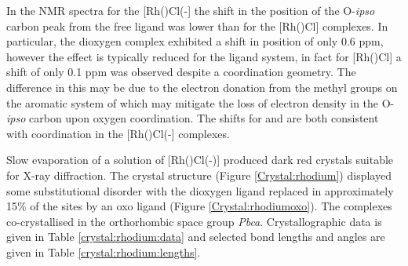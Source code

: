 
In the \carbon{} NMR spectra for the [Rh(\tBuxantphos)Cl(-] the shift in the position of the O-\emph{ipso} carbon peak from the free ligand was lower than for the [Rh(\tBuxantphos)Cl] complexes.  In particular, the \tButhixantphos{} dioxygen complex exhibited a shift in position of only 0.6 ppm, however the effect is typically reduced for the \tButhixantphos{} ligand system, in fact for [Rh(\tButhixantphos)Cl] a shift of only 0.1 ppm was observed despite a\POP{} coordination geometry.  The difference in this may be due to the electron donation from the methyl groups on the aromatic system of \tButhixantphos{} which may mitigate the loss of electron density in the O-\emph{ipso} carbon upon oxygen coordination.  The shifts for \tBusixantphos{} and \tBuxantphos{} are both consistent with \POP{} coordination in the [Rh(\tBuxantphos)Cl(-] complexes.  

Slow evaporation of a  solution of [Rh(\tBuxantphosk)Cl(-)] produced dark red crystals suitable for X-ray diffraction.  The crystal structure (Figure \ref{Crystal:rhodium}) displayed some substitutional disorder with the dioxygen ligand replaced in approximately 15\% of the sites by an oxo ligand (Figure \ref{Crystal:rhodiumoxo}).  The complexes co-crystallised in the orthorhombic space group \emph{Pbca}.  Crystallographic data is given in Table \ref{crystal:rhodium:data} and selected bond lengths and angles are given in Table \ref{crystal:rhodium:lengths}.



